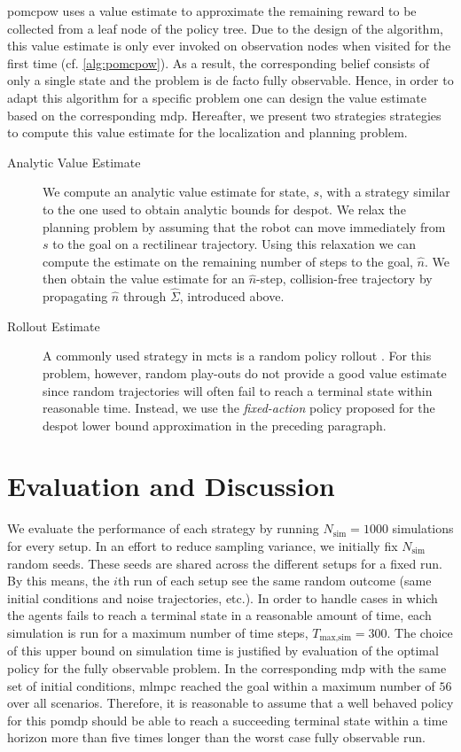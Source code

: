 \ac{pomcpow} uses a value estimate to approximate the remaining reward to be
collected from a leaf node of the policy tree. Due to the design of the
algorithm, this value estimate is only ever invoked on observation nodes when
visited for the first time (cf. \cref{alg:pomcpow}). As a result, the
corresponding belief consists of only a single state and the problem is de
facto fully observable. Hence, in order to adapt this algorithm for a specific
problem one can design the value estimate based on the corresponding \ac{mdp}.
Hereafter, we present two strategies strategies to compute this value estimate
for the localization and planning problem.

\begin{description}
  \item[Analytic Value Estimate] We compute an analytic value estimate for
    state, $s$, with a strategy similar to the one used to obtain analytic
    bounds for \ac{despot}. We relax the planning problem by assuming that the
    robot can move immediately from $s$ to the goal on a rectilinear
    trajectory. Using this relaxation we can compute the estimate on the
    remaining number of steps to the goal, $\hat{n}$. We then obtain the value
    estimate for an $\hat{n}$-step, collision-free trajectory by propagating
    $\hat{n}$ through $\hat{\Sigma}$, introduced above.
  \item[Rollout Estimate] A commonly used strategy in \ac{mcts} is a random
    policy rollout \cite{browne2012survey}. For this problem, however, random
    play-outs do not provide a good value estimate since random trajectories
    will often fail to reach a terminal state within reasonable time. Instead,
    we use the \emph{fixed-action} policy proposed for the \ac{despot} lower
    bound approximation in the preceding paragraph.
\end{description}

\section{Evaluation and Discussion}\label{sec:lp-evaluation}

We evaluate the performance of each strategy by running $N_\text{sim} = 1000$
simulations for every setup. In an effort to reduce sampling variance, we
initially fix $N_\text{sim}$ random seeds. These seeds are shared across the
different setups for a fixed run. By this means, the $i$th run of each setup
see the same random outcome (\ie same initial conditions and noise
trajectories, etc.). In order to handle cases in which the agents fails to
reach a terminal state in a reasonable amount of time, each simulation is run
for a maximum number of time steps, $T_\text{max,sim} = 300$. The choice of
this upper bound on simulation time is justified by evaluation of the optimal
policy for the fully observable problem. In the corresponding \ac{mdp} with the
same set of initial conditions, \ac{mlmpc} reached the goal within a maximum
number of $56$ over all scenarios. Therefore, it is reasonable to assume that
a well behaved policy for this \ac{pomdp} should be able to reach a succeeding
terminal state within a time horizon more than five times longer than the worst
case fully observable run.

